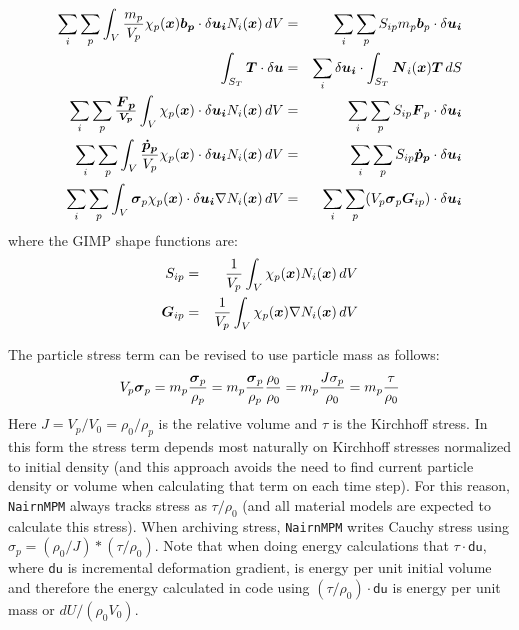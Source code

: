 \documentclass[11pt]{article}
\renewcommand{\vec}[1]{\boldsymbol{#1}}
\newcommand{\tens}[1]{\boldsymbol{\mathsf{#1}}}
\begin{document}
\begin{eqnarray}
   \sum_i\sum_p \int_V {m_p\over V_p} \chi_p(\vec x)\vec{b_p}\cdot \delta\vec{u_i} N_i(\vec x)\thinspace dV
    & = & \sum_i\sum_p S_{ip} m_p \vec b_p \cdot \delta\vec{u_i} \\
    \int_{S_T}\vec T \cdot \delta\vec u & = & \sum_i \delta\vec{u_i}\cdot \int_{S_T}\vec N_i(\vec x) \vec T \thinspace dS \\
    \sum_i\sum_p \vec {\vec F_p\over V_p} \int_V \chi_p(\vec x) \cdot \delta\vec{u_i} N_i(\vec x)\thinspace dV
    & = &  \sum_i\sum_p S_{ip} \vec F_p \cdot \delta\vec{u_i} \\
   \sum_i \sum_p\int_V {\vec{\dot p_p}\over V_p} \chi_p(\vec x)\cdot \delta\vec{u_i} N_i(\vec x)\thinspace dV
   & = &  \sum_i\sum_p S_{ip} \vec{\dot p_p} \cdot \delta\vec{u_i} \\
   \sum_i\sum_p\int_V \tens\sigma_p \chi_p(\vec x) \cdot \delta\vec{u_i} \nabla N_i(\vec x)\thinspace dV
   & = &  \sum_i\sum_p (V_p\tens\sigma_p \vec G_{ip} )\cdot \delta\vec{u_i}
\end{eqnarray}
where the GIMP shape functions are:
\begin{eqnarray}
     S_{ip} & = & {1\over V_p} \int_V \chi_p(\vec x) N_i(\vec x)\thinspace dV    \label{Sipdef} \\
     \vec G_{ip} & = & {1\over V_p} \int_V \chi_p(\vec x) \nabla N_i(\vec x)\thinspace dV   \label{Gipdef}
\end{eqnarray}

The particle stress term can be revised to use particle mass as follows:
\begin{equation}
     V_p\tens\sigma_p = m_p {\tens\sigma_p\over\rho_p} = m_p {\tens\sigma_p\over\rho_p} {\rho_0\over\rho_0} = m_p {J\sigma_p\over\rho_0} = m_p{\tau\over\rho_0}
\end{equation}
Here $J = V_p/V_0 = \rho_0/\rho_p$ is the relative volume and $\tens\tau$ is the Kirchhoff stress. In this form the stress term depends most naturally on Kirchhoff stresses normalized to initial density (and this approach avoids the need to find current particle density or volume when calculating that term on each time step). For this reason, {\tt NairnMPM} always tracks stress as  $\tens\tau/\rho_0$ (and all material models are expected to calculate this stress). When archiving stress, {\tt NairnMPM} writes Cauchy stress using $\tens\sigma_p = (\rho_0/J)*(\tau/\rho_0)$. Note that when doing energy calculations that $\tens\tau \cdot \tens{du}$, where $\tens{du}$ is incremental deformation gradient, is energy per unit initial volume and therefore the energy calculated in code using  $(\tau/\rho_0) \cdot \tens{du}$ is energy per unit mass or $dU/(\rho_0V_0)$.
\end{document}
